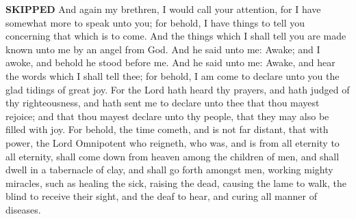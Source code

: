 \bchapter \textbf{SKIPPED}
\bverse \iffalse And again my brethren, I would call your attention, for I have somewhat more to speak unto you; for behold, I have things to tell you concerning that which is to come. \fi
And again my brethren, I would call your attention, for I have somewhat more to speak unto you; for behold, I have things to tell you concerning that which is to come.
\bverse \iffalse And the things which I shall tell you are made known unto me by an angel from God. And he said unto me: Awake; and I awoke, and behold he stood before me. \fi
And the things which I shall tell you are made known unto me by an angel from God. And he said unto me: Awake; and I awoke, and behold he stood before me.
\bverse \iffalse And he said unto me: Awake, and hear the words which I shall tell thee; for behold, I am come to declare unto you the glad tidings of great joy. \fi
And he said unto me: Awake, and hear the words which I shall tell thee; for behold, I am come to declare unto you the glad tidings of great joy.
\bverse \iffalse For the Lord hath heard thy prayers, and hath judged of thy righteousness, and hath sent me to declare unto thee that thou mayest rejoice; and that thou mayest declare unto thy people, that they may also be filled with joy. \fi
For the Lord hath heard thy prayers, and hath judged of thy righteousness, and hath sent me to declare unto thee that thou mayest rejoice; and that thou mayest declare unto thy people, that they may also be filled with joy.
\bverse \iffalse For behold, the time cometh, and is not far distant, that with power, the Lord Omnipotent who reigneth, who was, and is from all eternity to all eternity, shall come down from heaven among the children of men, and shall dwell in a tabernacle of clay, and shall go forth amongst men, working mighty miracles, such as healing the sick, raising the dead, causing the lame to walk, the blind to receive their sight, and the deaf to hear, and curing all manner of diseases. \fi
For behold, the time cometh, and is not far distant, that with power, the Lord Omnipotent who reigneth, who was, and is from all eternity to all eternity, shall come down from heaven among the children of men, and shall dwell in a tabernacle of clay, and shall go forth amongst men, working mighty miracles, such as healing the sick, raising the dead, causing the lame to walk, the blind to receive their sight, and the deaf to hear, and curing all manner of diseases.
\bverse \iffalse And he shall cast out devils, or the evil spirits which dwell in the hearts of the children of men. \fi

